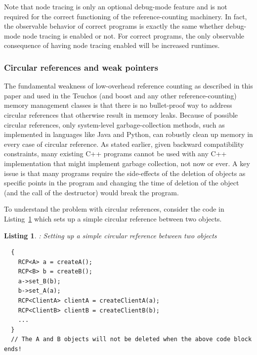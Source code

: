 \documentclass[pdf,ps2pdf,11pt]{SANDreport}
\newtheorem{listing}{Listing}
\begin{document}
Note that node tracing is only an optional debug-mode feature and is
not required for the correct functioning of the reference-counting
machinery.  In fact, the observable behavior of correct programs is
exactly the same whether debug-mode node tracing is enabled or not.
For correct programs, the only observable consequence of having node
tracing enabled will be increased runtimes.


%
{}\subsubsection{Circular references and weak pointers}
\label{sec:circular-references-weak-pointers}
%

The fundamental weakness of low-overhead reference counting as
described in this paper and used in the Teuchos (and boost and any
other reference-counting) memory management classes is that there is
no bullet-proof way to address circular references that otherwise
result in memory leaks.  Because of possible circular references, only
system-level garbage-collection methods, such as implemented in
languages like Java and Python, can robustly clean up memory in every
case of circular reference.  As stated earlier, given backward
compatibility constraints, many existing C++ programs cannot be used
with any C++ implementation that might implement garbage collection,
not now or ever.  A key issue is that many programs require the
side-effects of the deletion of objects as specific points in the
program and changing the time of deletion of the object (and the call
of the destructor) would break the program.

To understand the problem with circular references, consider the code
in Listing~\ref{listing:CircularRCP_A_B} which sets up a simple
circular reference between two objects.


\begin{listing}: Setting up a simple circular reference between two objects \\
\label{listing:CircularRCP_A_B}
{\small\begin{verbatim}
  {
    RCP<A> a = createA();
    RCP<B> b = createB();
    a->set_B(b);
    b->set_A(a);
    RCP<ClientA> clientA = createClientA(a);
    RCP<ClientB> clientB = createClientB(b);
    ...
  }
  // The A and B objects will not be deleted when the above code block ends!
\end{verbatim}}
\end{listing}
\end{document}

